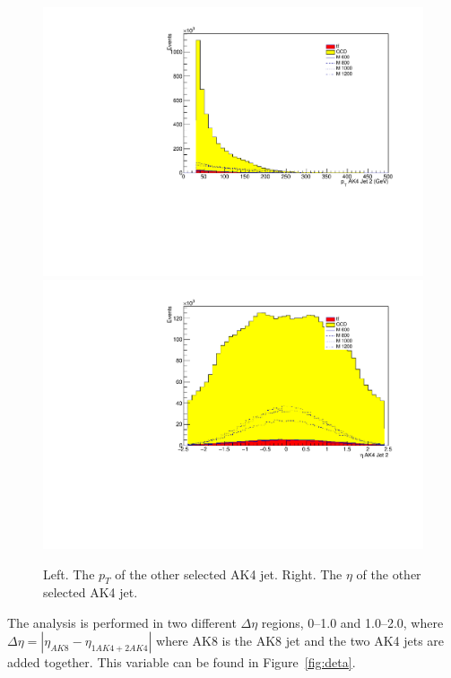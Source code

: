 \begin{figure}[thb!]
\begin{center}
\includegraphics[scale=0.34]{F5/shapeptJ2.pdf}
\includegraphics[scale=0.34]{F5/shapeetaJ2.pdf}\\
\end{center}
\caption{Left. The $p_{T}$ of the other selected AK4 jet. Right. The $\eta$ of the other selected AK4 jet.}
\label{fig:AK42pteta}
\end{figure} 

The analysis is performed in two different $\Delta\eta$ regions, 0--1.0 and 1.0--2.0, where $\Delta\eta = |\eta_{AK8} - \eta_{1AK4 + 2AK4}|$ where AK8 is the AK8 jet and the two AK4 jets are added together. This variable can be found in Figure~\ref{fig:deta}. 

